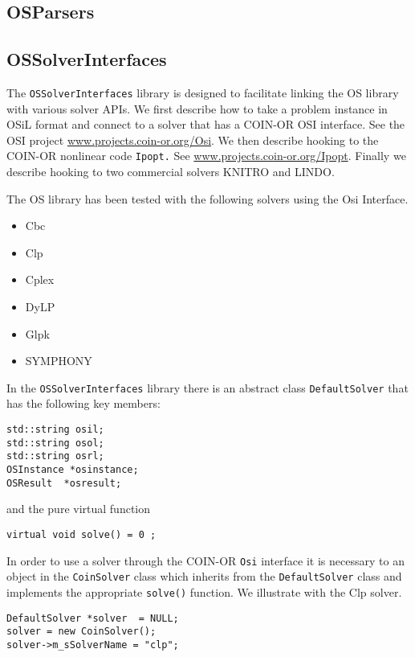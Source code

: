 \documentclass[11pt]{article}
\renewcommand{\_}{{\char"5F}}
\renewcommand{\{}{{\char"7B}}
\renewcommand{\}}{{\char"7D}}
\renewcommand{\^}{{\char"0D}}
\renewcommand{\'}{{\char"0D}}
\begin{document}
\subsection{OSParsers}



\subsection{OSSolverInterfaces}


The {\tt OSSolverInterfaces} library is designed to facilitate linking the OS library with various solver APIs. We first describe how to take a problem instance in OSiL format and connect to a solver that has a COIN-OR OSI interface.  See the OSI project \url{www.projects.coin-or.org/Osi}.   We then describe hooking to the COIN-OR nonlinear code {\tt Ipopt.} See \url{www.projects.coin-or.org/Ipopt}.  Finally we describe hooking to two commercial solvers KNITRO and LINDO. 

The OS library has been tested with the following solvers using the Osi Interface.

\begin{itemize}
\item Cbc
\item Clp
\item Cplex
\item DyLP
\item Glpk
\item SYMPHONY
\end{itemize}

In the {\tt OSSolverInterfaces} library there is an abstract class {\tt DefaultSolver} that has the following key members:

\begin{verbatim}
std::string osil;
std::string osol;
std::string osrl;
OSInstance *osinstance;
OSResult  *osresult;
\end{verbatim}
and the pure virtual function
\begin{verbatim}
virtual void solve() = 0 ;	
\end{verbatim}
In order to use a solver through the COIN-OR {\tt Osi} interface it is necessary to an object in the {\tt CoinSolver} class which inherits from the {\tt DefaultSolver} class and implements the appropriate {\tt solve()} function.  We illustrate with the Clp solver.

\begin{verbatim}
DefaultSolver *solver  = NULL;
solver = new CoinSolver();
solver->m_sSolverName = "clp";
\end{verbatim}
\end{document}
